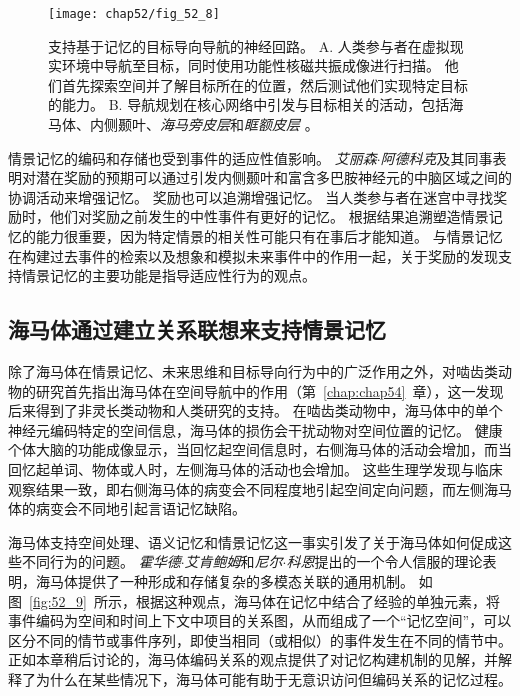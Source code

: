 \begin{figure}[htbp]
	\centering
	\texttt{[image: chap52/fig\_52\_8]}
	\caption{支持基于记忆的目标导向导航的神经回路\cite{brown2016prospective}。
		A. 人类参与者在虚拟现实环境中导航至目标，同时使用功能性核磁共振成像进行扫描。
		他们首先探索空间并了解目标所在的位置，然后测试他们实现特定目标的能力。
		B. 导航规划在核心网络中引发与目标相关的活动，包括海马体、内侧颞叶、\textit{海马旁皮层}和\textit{眶额皮层 }。}
	\label{fig:52_8}
\end{figure}


情景记忆的编码和存储也受到事件的适应性值影响。
\textit{艾丽森$\cdot$阿德科克}及其同事表明对潜在奖励的预期可以通过引发内侧颞叶和富含多巴胺神经元的中脑区域之间的协调活动来增强记忆。
奖励也可以追溯增强记忆。
当人类参与者在迷宫中寻找奖励时，他们对奖励之前发生的中性事件有更好的记忆。
根据结果​​追溯塑造情景记忆的能力很重要，因为特定情景的相关性可能只有在事后才能知道。
与情景记忆在构建过去事件的检索以及想象和模拟未来事件中的作用一起，关于奖励的发现支持情景记忆的主要功能是指导适应性行为的观点。



\subsection{海马体通过建立关系联想来支持情景记忆}

除了海马体在情景记忆、未来思维和目标导向行为中的广泛作用之外，对啮齿类动物的研究首先指出海马体在空间导航中的作用（第~\ref{chap:chap54}~章），这一发现后来得到了非灵长类动物和人类研究的支持。
在啮齿类动物中，海马体中的单个神经元编码特定的空间信息，海马体的损伤会干扰动物对空间位置的记忆。
健康个体大脑的功能成像显示，当回忆起空间信息时，右侧海马体的活动会增加，而当回忆起单词、物体或人时，左侧海马体的活动也会增加。
这些生理学发现与临床观察结果一致，即右侧海马体的病变会不同程度地引起空间定向问题，而左侧海马体的病变会不同地引起言语记忆缺陷。


海马体支持空间处理、语义记忆和情景记忆这一事实引发了关于海马体如何促成这些不同行为的问题。
\textit{霍华德$\cdot$艾肯鲍姆}和\textit{尼尔$\cdot$科恩}提出的一个令人信服的理论表明，海马体提供了一种形成和存储复杂的多模态关联的通用机制。
如图~\ref{fig:52_9}~所示，根据这种观点，海马体在记忆中结合了经验的单独元素，将事件编码为空间和时间上下文中项目的关系图，从而组成了一个“记忆空间”，可以区分不同的情节或事件序列，即使当相同（或相似）的事件发生在不同的情节中。
正如本章稍后讨论的，海马体编码关系的观点提供了对记忆构建机制的见解，并解释了为什么在某些情况下，海马体可能有助于无意识访问但编码关系的记忆过程。


